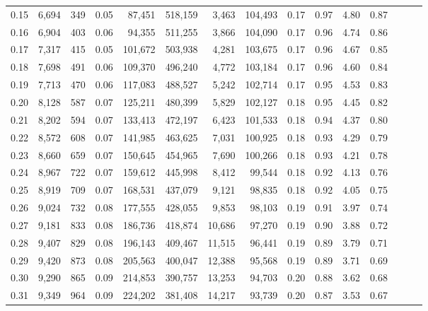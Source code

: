 \begin{tabular}{rrrrrrrrrrrrrrr}
0.15 &   6,694 &    349 &  0.05 &   87,451 &  518,159 &    3,463 &  104,493 &  0.17 &  0.97 &  4.80 &      0.87 \\
0.16 &   6,904 &    403 &  0.06 &   94,355 &  511,255 &    3,866 &  104,090 &  0.17 &  0.96 &  4.74 &      0.86 \\
0.17 &   7,317 &    415 &  0.05 &  101,672 &  503,938 &    4,281 &  103,675 &  0.17 &  0.96 &  4.67 &      0.85 \\
0.18 &   7,698 &    491 &  0.06 &  109,370 &  496,240 &    4,772 &  103,184 &  0.17 &  0.96 &  4.60 &      0.84 \\
0.19 &   7,713 &    470 &  0.06 &  117,083 &  488,527 &    5,242 &  102,714 &  0.17 &  0.95 &  4.53 &      0.83 \\
0.20 &   8,128 &    587 &  0.07 &  125,211 &  480,399 &    5,829 &  102,127 &  0.18 &  0.95 &  4.45 &      0.82 \\
0.21 &   8,202 &    594 &  0.07 &  133,413 &  472,197 &    6,423 &  101,533 &  0.18 &  0.94 &  4.37 &      0.80 \\
0.22 &   8,572 &    608 &  0.07 &  141,985 &  463,625 &    7,031 &  100,925 &  0.18 &  0.93 &  4.29 &      0.79 \\
0.23 &   8,660 &    659 &  0.07 &  150,645 &  454,965 &    7,690 &  100,266 &  0.18 &  0.93 &  4.21 &      0.78 \\
0.24 &   8,967 &    722 &  0.07 &  159,612 &  445,998 &    8,412 &   99,544 &  0.18 &  0.92 &  4.13 &      0.76 \\
0.25 &   8,919 &    709 &  0.07 &  168,531 &  437,079 &    9,121 &   98,835 &  0.18 &  0.92 &  4.05 &      0.75 \\
0.26 &   9,024 &    732 &  0.08 &  177,555 &  428,055 &    9,853 &   98,103 &  0.19 &  0.91 &  3.97 &      0.74 \\
0.27 &   9,181 &    833 &  0.08 &  186,736 &  418,874 &   10,686 &   97,270 &  0.19 &  0.90 &  3.88 &      0.72 \\
0.28 &   9,407 &    829 &  0.08 &  196,143 &  409,467 &   11,515 &   96,441 &  0.19 &  0.89 &  3.79 &      0.71 \\
0.29 &   9,420 &    873 &  0.08 &  205,563 &  400,047 &   12,388 &   95,568 &  0.19 &  0.89 &  3.71 &      0.69 \\
0.30 &   9,290 &    865 &  0.09 &  214,853 &  390,757 &   13,253 &   94,703 &  0.20 &  0.88 &  3.62 &      0.68 \\
0.31 &   9,349 &    964 &  0.09 &  224,202 &  381,408 &   14,217 &   93,739 &  0.20 &  0.87 &  3.53 &      0.67 \\

\end{tabular}
